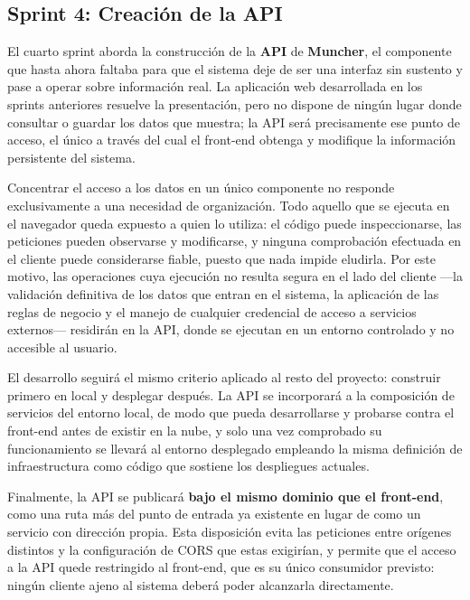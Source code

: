 \subsection*{Sprint 4: Creación de la API}

El cuarto sprint aborda la construcción de la \textbf{API} de \textbf{Muncher},
el componente que hasta ahora faltaba para que el sistema deje de ser una
interfaz sin sustento y pase a operar sobre información real. La aplicación web
desarrollada en los sprints anteriores resuelve la presentación, pero no dispone
de ningún lugar donde consultar o guardar los datos que muestra; la API será
precisamente ese punto de acceso, el único a través del cual el front-end
obtenga y modifique la información persistente del sistema.

Concentrar el acceso a los datos en un único componente no responde
exclusivamente a una necesidad de organización. Todo aquello que se ejecuta en
el navegador queda expuesto a quien lo utiliza: el código puede inspeccionarse,
las peticiones pueden observarse y modificarse, y ninguna comprobación
efectuada en el cliente puede considerarse fiable, puesto que nada impide
eludirla. Por este motivo, las operaciones cuya ejecución no resulta segura en
el lado del cliente —la validación definitiva de los datos que entran en el
sistema, la aplicación de las reglas de negocio y el manejo de cualquier
credencial de acceso a servicios externos— residirán en la API, donde se
ejecutan en un entorno controlado y no accesible al usuario.

El desarrollo seguirá el mismo criterio aplicado al resto del proyecto:
construir primero en local y desplegar después. La API se incorporará a la
composición de servicios del entorno local, de modo que pueda desarrollarse y
probarse contra el front-end antes de existir en la nube, y solo una vez
comprobado su funcionamiento se llevará al entorno desplegado empleando la
misma definición de infraestructura como código que sostiene los despliegues
actuales.

Finalmente, la API se publicará \textbf{bajo el mismo dominio que el
	front-end}, como una ruta más del punto de entrada ya existente en lugar de
como un servicio con dirección propia. Esta disposición evita las peticiones
entre orígenes distintos y la configuración de CORS que estas exigirían, y
permite que el acceso a la API quede restringido al front-end, que es su único
consumidor previsto: ningún cliente ajeno al sistema deberá poder alcanzarla
directamente.

